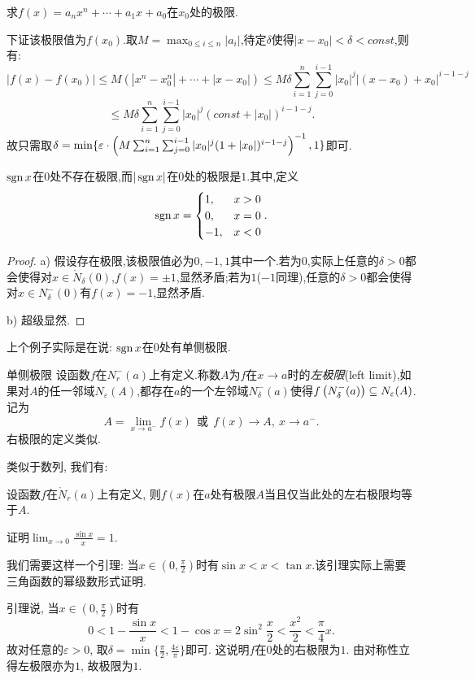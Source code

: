 \begin{example}
	求$f(x)=a_nx^n + \cdots + a_1x+a_0$在$x_0$处的极限.
\end{example}
\begin{solution}
	下证该极限值为$f(x_0)$.取$M=\max_{0 \leq i \leq n}|a_i|$,待定$\delta$使得$|x-x_0|<\delta <const$,则有:
	$$|f(x)-f(x_0)|\leq M(|x^n-x_0^n| + \cdots + |x-x_0|) \leq M\delta\sum_{i=1}^{n} \sum_{j=0}^{i-1} |x_0|^j |(x-x_0)+x_0|^{i-1-j}$$
	$$\leq M\delta\sum_{i=1}^{n} \sum_{j=0}^{i-1} |x_0|^j (const +|x_0|)^{i-1-j}.$$
	故只需取$\delta = \min \{ \varepsilon \cdot \left( M\sum_{i=1}^{n} \sum_{j=0}^{i-1} |x_0|^j (1 +|x_0|)^{i-1-j} \right)^{-1},1 \}$即可.
\end{solution}

\begin{example}
	$\operatorname{sgn} x$在$0$处不存在极限,而$|\operatorname{sgn} x|$在$0$处的极限是$1$.其中,定义$$\operatorname{sgn} x = \begin{cases}
		1,&x>0 \\ 0,&x=0 \\ -1,&x<0
	\end{cases}.$$
\end{example}
\begin{proof}
	a) 假设存在极限,该极限值必为$0,-1,1$其中一个.若为$0$,实际上任意的$\delta >0$都会使得对$x \in \mathring{N}_{\delta} (0)$,$f(x)=\pm 1$,显然矛盾;若为$1$($-1$同理),任意的$\delta >0$都会使得对$x \in N_{\delta}^{-}(0)$有$f(x)=-1$,显然矛盾.
	
	b) 超级显然.
\end{proof}

上个例子实际是在说: $\operatorname{sgn} x$在$0$处有单侧极限.

\begin{definition}{单侧极限}
	设函数$f$在$N_{r}^{-}(a)$上有定义.称数$A$为$f$在$x\to a$时的\textit{左极限}(left limit),如果对$A$的任一邻域$N_{\varepsilon}(A)$,都存在$a$的一个左邻域$N_{\delta}^{-}(a)$使得$f\left( N_{\delta}^{-}(a) \right) \subseteq N_{\varepsilon}(A)$.记为$$A = \lim_{x \to a^-} f(x) ~~ \text{或} ~~ f(x) \to A,~x \to a^{-}.$$
	右极限的定义类似.
\end{definition}

类似于数列, 我们有: 

\begin{proposition}{}
	设函数$f$在$\mathring{N}_{r}(a)$上有定义, 则$f(x)$在$a$处有极限$A$当且仅当此处的左右极限均等于$A$.
\end{proposition}

\begin{example}
	证明$\lim_{x\to 0} \frac{\sin x}{x}=1$.
\end{example}
\begin{solution}
	我们需要这样一个引理: 当$x\in (0,\frac{\pi}{2})$时有$\sin x < x < \tan x$.该引理实际上需要三角函数的幂级数形式证明.
	
	引理说, 当$x \in (0,\frac{\pi}{2})$时有$$0<1-\frac{\sin x}{x} < 1-\cos x = 2\sin^2 \frac{x}{2} < \frac{x^2}{2} < \frac{\pi}{4} x.$$
	故对任意的$\varepsilon >0$, 取$\delta = \min \{ \frac{\pi}{2},\frac{4\varepsilon}{\pi} \}$即可. 这说明$f$在$0$处的右极限为$1$. 由对称性立得左极限亦为$1$, 故极限为$1$. 
\end{solution}


